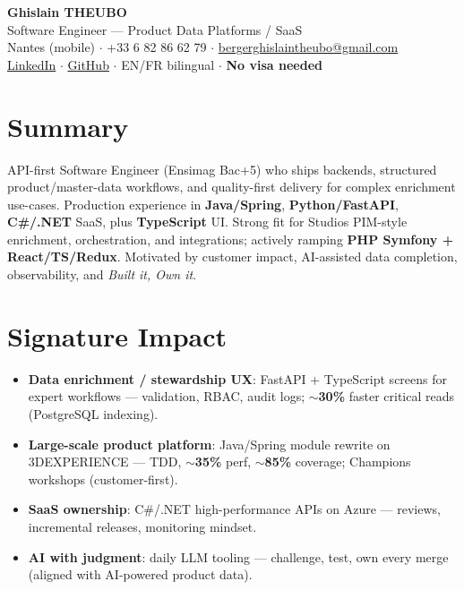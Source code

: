 \documentclass[10pt,a4paper]{article}
\begin{document}
\begin{center}
{\LARGE\bfseries Ghislain THEUBO}\\[1pt]
{\large Software Engineer --- Product Data Platforms / SaaS}\\[2pt]
Nantes (mobile) $\cdot$ +33 6 82 86 62 79 $\cdot$ \href{mailto:bergerghislaintheubo@gmail.com}{bergerghislaintheubo@gmail.com}\\
\href{https://www.linkedin.com/in/berger-ghislain}{LinkedIn} $\cdot$ \href{https://github.com/Bergerghislain}{GitHub} $\cdot$ EN/FR bilingual $\cdot$ \textbf{No visa needed}
\end{center}

\section{Summary}
API-first Software Engineer (Ensimag Bac+5) who ships backends, structured product/master-data workflows, and quality-first delivery for complex enrichment use-cases. Production experience in \textbf{Java/Spring}, \textbf{Python/FastAPI}, \textbf{C\#/.NET} SaaS, plus \textbf{TypeScript} UI. Strong fit for Studios PIM-style enrichment, orchestration, and integrations; actively ramping \textbf{PHP Symfony + React/TS/Redux}. Motivated by customer impact, AI-assisted data completion, observability, and \textit{Built it, Own it}.

\section{Signature Impact}
\begin{itemize}
  \item \textbf{Data enrichment / stewardship UX}: FastAPI + TypeScript screens for expert workflows --- validation, RBAC, audit logs; \textbf{$\sim$30\%} faster critical reads (PostgreSQL indexing).
  \item \textbf{Large-scale product platform}: Java/Spring module rewrite on 3DEXPERIENCE --- TDD, \textbf{$\sim$35\%} perf, \textbf{$\sim$85\%} coverage; Champions workshops (customer-first).
  \item \textbf{SaaS ownership}: C\#/.NET high-performance APIs on Azure --- reviews, incremental releases, monitoring mindset.
  \item \textbf{AI with judgment}: daily LLM tooling --- challenge, test, own every merge (aligned with AI-powered product data).
\end{itemize}
\end{document}
